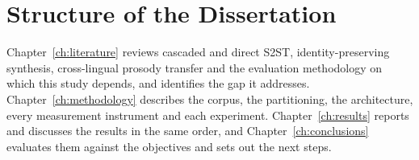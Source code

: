 \section{Structure of the Dissertation}
\label{sec:structure}

Chapter~\ref{ch:literature} reviews cascaded and direct S2ST, identity-preserving synthesis,
cross-lingual prosody transfer and the evaluation methodology on which this study depends, and
identifies the gap it addresses. Chapter~\ref{ch:methodology} describes the corpus, the
partitioning, the architecture, every measurement instrument and each experiment.
Chapter~\ref{ch:results} reports and discusses the results in the same order, and
Chapter~\ref{ch:conclusions} evaluates them against the objectives and sets out the next steps.

